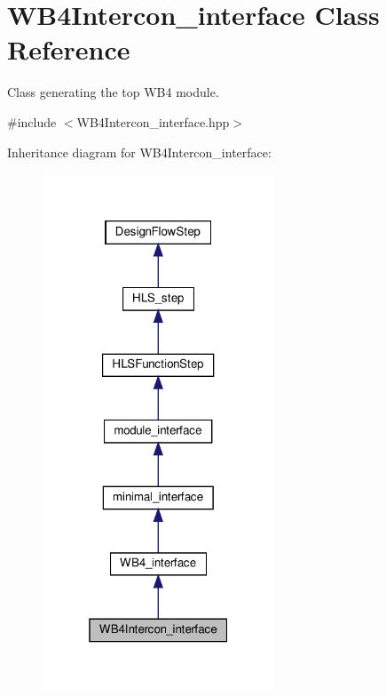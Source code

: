 \hypertarget{classWB4Intercon__interface}{}\section{W\+B4\+Intercon\+\_\+interface Class Reference}
\label{classWB4Intercon__interface}


Class generating the top W\+B4 module.  




{\ttfamily \#include $<$W\+B4\+Intercon\+\_\+interface.\+hpp$>$}



Inheritance diagram for W\+B4\+Intercon\+\_\+interface\+:
\nopagebreak
\begin{figure}[H]
\begin{center}
\leavevmode
\includegraphics[width=196pt]{d0/d55/classWB4Intercon__interface__inherit__graph}
\end{center}
\end{figure}


